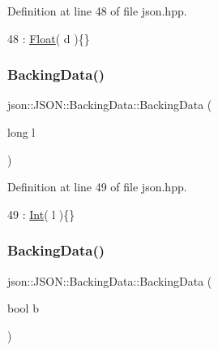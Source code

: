 Definition at line 48 of file json.\+hpp.


\begin{DoxyCode}
48 : \mbox{\hyperlink{unionjson_1_1_j_s_o_n_1_1_backing_data_aac4950afa6b9205bb367a33de47faa5c}{Float}}( d )\{\}
\end{DoxyCode}
\mbox{\label{unionjson_1_1_j_s_o_n_1_1_backing_data_a25277bc3224f9a7ed291fe209b9294d2}} 
\subsubsection{\texorpdfstring{Backing\+Data()}{BackingData()}\hspace{0.1cm}{\footnotesize\ttfamily [2/5]}}
{\footnotesize\ttfamily json\+::\+J\+S\+O\+N\+::\+Backing\+Data\+::\+Backing\+Data (\begin{DoxyParamCaption}\item[{long}]{l }\end{DoxyParamCaption})\hspace{0.3cm}{\ttfamily [inline]}}



Definition at line 49 of file json.\+hpp.


\begin{DoxyCode}
49 : \mbox{\hyperlink{unionjson_1_1_j_s_o_n_1_1_backing_data_a0d80815a70ff5bb9345f75de79ec81c3}{Int}}( l )\{\}
\end{DoxyCode}
\mbox{\label{unionjson_1_1_j_s_o_n_1_1_backing_data_abe54395f8ce5d9918ff0704a4e1bae98}} 
\subsubsection{\texorpdfstring{Backing\+Data()}{BackingData()}\hspace{0.1cm}{\footnotesize\ttfamily [3/5]}}
{\footnotesize\ttfamily json\+::\+J\+S\+O\+N\+::\+Backing\+Data\+::\+Backing\+Data (\begin{DoxyParamCaption}\item[{bool}]{b }\end{DoxyParamCaption})\hspace{0.3cm}{\ttfamily [inline]}}



